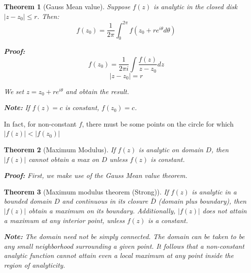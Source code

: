\documentclass{article}
\newtheorem{theorem}{Theorem}[section]
\theoremstyle{definition}
\begin{document}
\begin{theorem}[Gauss Mean value]
Suppose $f(z)$ is analytic in the closed disk $|z-z_0| \leq r$. Then:
$$f(z_0) = \frac{1}{2 \pi } \int_{0}^{2\pi} f(z_0 + r e^{i\theta} d\theta)$$

\textbf{Proof:}
$$f(z_0) = \frac{1}{2 \pi i } \int \frac{f(z)}{z-z_0} dz$$
$$|z-z_0| = r$$

We set $z = z_0 + r e^{i\theta}$ and obtain the result. 

\textbf{Note:} If $f(z) = c$ is constant, $f(z_0)=c$. 
\end{theorem}
In fact, for non-constant $f$, there must be some points on the circle for which $|f(z)| < |f(z_0)|$

\begin{theorem}[Maximum Modulus]
If $f(z)$ is analytic on domain $D$, then $|f(z)|$ cannot obtain a max on $D$ unless $f(z)$ is constant. 

\textbf{Proof:}
First, we make use of the Gauss Mean value theorem. 
\end{theorem}

\begin{theorem}[Maximum modulus theorem (Strong)]
If $f(z)$ is analytic in a bounded domain $D$ and continuous in its closure $\bar{D}$ (domain plus boundary), then $|f(z)|$ obtain a maximum on its boundary. Additionally, $|f(z)|$ does not attain a maximum at any interior point, unless $f(z) $ is a constant.

\textbf{Note:} The domain need not be simply connected. The domain can be taken to be any small neighborhood surrounding a given point. It follows that a non-constant analytic function cannot attain even a local maximum at any point inside the region of analyticity.
\end{theorem}
\end{document}
